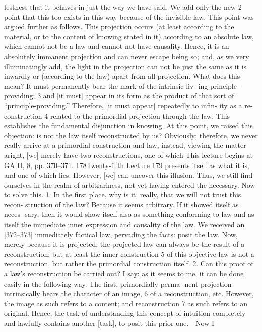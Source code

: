 festness that it behaves in just the way we have said. We add only the new 2
point that this too exists in this way because of the invisible law.
This point was argued further as follows. This projection occurs (at least
according to the material, or to the content of knowing stated in it) according
to an absolute law, which cannot not be a law and cannot not have causality.
Hence, it is an absolutely immanent projection and can never escape being so;
and, as we very illuminatingly add, the light in the projection can not be just
the same as it is inwardly or (according to the law) apart from all projection.
What does this mean? It must permanently bear the mark of the intrinsic liv-
ing principle-providing; 3 and [it must] appear in its form as the product of that
sort of “principle-providing.” Therefore, [it must appear] repeatedly to infin-
ity as a re-construction 4 related to the primordial projection through the law.
This establishes the fundamental disjunction in knowing. At this point, we
raised this objection: is not the law itself reconstructed by us? Obviously;
therefore, we never really arrive at a primordial construction and law, instead,
viewing the matter aright, [we] merely have two reconstructions, one of which
This lecture begins at GA II, 8, pp. 370–371.
178Twenty-fifth Lecture
179
presents itself as what it is, and one of which lies. However, [we] can uncover
this illusion. Thus, we still find ourselves in the realm of arbitrariness, not yet
having entered the necessary. Now to solve this.
1. In the first place, why is it, really, that we will not trust this recon-
struction of the law? Because it seems arbitrary. If it showed itself as neces-
sary, then it would show itself also as something conforming to law and as
itself the immediate inner expression and causality of the law. We received an
[372–373] immediately factical law, pervading the facts: posit the law. Now,
merely because it is projected, the projected law can always be the result of a
reconstruction; but at least the inner construction 5 of this objective law is not a
reconstruction, but rather the primordial construction itself.
2. Can this proof of a law’s reconstruction be carried out? I say: as it seems
to me, it can be done easily in the following way. The first, primordially perma-
nent projection intrinsically bears the character of an image, 6 of a reconstruction,
etc. However, the image as such refers to a content; and reconstruction 7 as such
refers to an original. Hence, the task of understanding this concept of intuition
completely and lawfully contains another [task], to posit this prior one.—Now I
